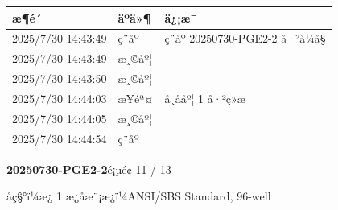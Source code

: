 \documentclass[UTF8,10pt,a4paper,fontset=fandol]{ctexart}
\newcommand{\fieldvalue}[1]{#1}
\begin{document}
\begin{center}
\begin{center}
\small
\begin{tabularx}{\textwidth}{@{}l l X@{}}
æ¶é´ & äºä»¶ & ä¿¡æ¯ \\ \hline
\fieldvalue{2025/7/30 14:43:49}
&
\fieldvalue{ç¨åº}
&
\fieldvalue{ç¨åº 20250730-PGE2-2 å·²å¼å§}
\\
\fieldvalue{2025/7/30 14:43:49}
&
\fieldvalue{æ¸©åº¦}
&
\\
\fieldvalue{2025/7/30 14:43:50}
&
\fieldvalue{æ¸©åº¦}
&
\\
\fieldvalue{2025/7/30 14:44:03}
&
\fieldvalue{æ­¥éª¤}
&
\fieldvalue{å¸ååº¦ 1 å·²ç»æ}
\\
\fieldvalue{2025/7/30 14:44:05}
&
\fieldvalue{æ¸©åº¦}
&
\\
\fieldvalue{2025/7/30 14:44:54}
&
\fieldvalue{ç¨åº}
&
\end{tabularx}
\normalsize

\newpage

\noindent\textbf{20250730-PGE2-2}\hfill é¡µé¢ 11 / 13

\noindent åç§°ï¼æ¿ 1 \hfill æ¿åæ¨¡æ¿ï¼ANSI/SBS Standard, 96-well

\medskip


\end{center}
\end{center}
\end{document}
